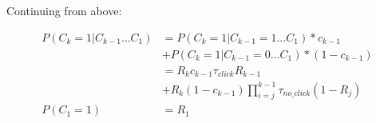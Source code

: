 Continuing from above:

\begin{align*}
P(C_k = 1 |C_{k-1} \dots C_1)
&= P(C_k = 1 | C_{k-1}=1 \dots C_1) * c_{k-1} \\
&+ P(C_k = 1 | C_{k-1}=0 \dots C_1) * (1-c_{k-1}) \\
&= R_k c_{k-1}\tau_{click}R_{k-1} \\
&+ R_k (1-c_{k-1}) \prod^{k-1}_{i = j}\tau_{no\_click} (1-R_j) \\
P(C_1 = 1) &= R_1 \\
\end{align*}

